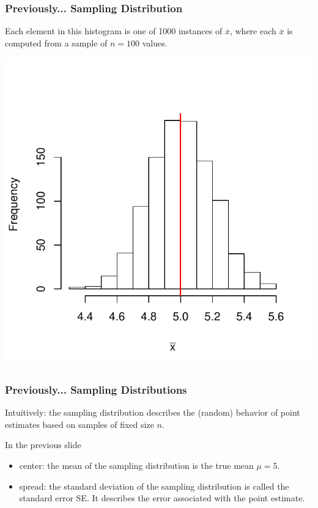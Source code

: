 \documentclass[handout]{beamer}
\newcommand{\blue}[1]{\textcolor{blue2}{#1}}
\newcommand{\xbar}{\overline{x}}
\begin{document}
\begin{frame}
\frametitle{Previously... Sampling Distribution}
Each element in this histogram is one of 1000 instances of $\xbar$, where each $\xbar$ is computed from a sample of $n=100$ values.
\begin{center}
\includegraphics{figure/lec12-001}
\end{center}
\end{frame}





\begin{frame}[fragile]
\frametitle{Previously... Sampling Distributions}

Intuitively: the \blue{sampling distribution} describes the (random) behavior of point estimates based on samples of fixed size $n$.  

\pause \vspace{0.5cm}
In the previous slide
\begin{itemize}
\pause \item \blue{center}: the mean of the sampling distribution is the true mean $\mu=5$.
\pause \item \blue{spread}: the standard deviation of the sampling distribution is called the \blue{standard error SE}.  It describes the error associated with the point estimate.  
\end{itemize}

\end{frame}
\end{document}
